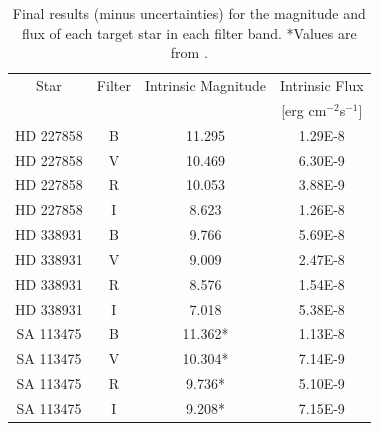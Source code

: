 \documentclass{article}
\begin{document}
\begin{table}
\begin{center}
\begin{tabular}{c | c | c | c}
Star & Filter & Intrinsic Magnitude & Intrinsic Flux \\
& & & [erg cm$^{-2}$s$^{-1}$] \\
\hline
HD 227858 & B & 11.295 & 1.29E-8\\
HD 227858 & V & 10.469  & 6.30E-9\\
HD 227858 & R & 10.053 & 3.88E-9\\
HD 227858 & I  & 8.623 & 1.26E-8\\
HD 338931 & B & 9.766 & 5.69E-8\\
HD 338931 & V & 9.009  & 2.47E-8\\
HD 338931 & R & 8.576 & 1.54E-8\\
HD 338931 & I & 7.018 & 5.38E-8\\
SA 113475 & B & 11.362* & 1.13E-8\\
SA 113475 & V & 10.304* & 7.14E-9\\
SA 113475 & R  & 9.736* & 5.10E-9\\
SA 113475 & I  & 9.208* & 7.15E-9\\
\end{tabular}
\caption{Final results (minus uncertainties) for the magnitude and flux of each target star in each filter band. *Values are from \cite{landolt}.}
\label{table:realflux}
\end{center}
\end{table}
\end{document}
